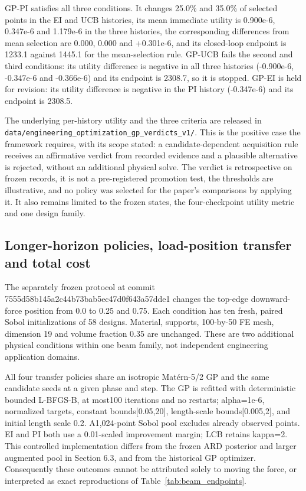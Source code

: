 \documentclass[]{interact}
\begin{document}
GP-PI satisfies all three conditions. It changes 25.0\% and 35.0\% of selected points in the EI and UCB histories, its mean immediate utility is 0.900e-6, 0.347e-6 and 1.179e-6 in the three histories, the corresponding differences from mean selection are 0.000, 0.000 and +0.301e-6, and its closed-loop endpoint is 1233.1 against 1445.1 for the mean-selection rule. GP-UCB fails the second and third conditions: its utility difference is negative in all three histories (-0.900e-6, -0.347e-6 and -0.366e-6) and its endpoint is 2308.7, so it is stopped. GP-EI is held for revision: its utility difference is negative in the PI history (-0.347e-6) and its endpoint is 2308.5.

The underlying per-history utility and the three criteria are released in \texttt{data/engineering\_optimization\_gp\_verdicts\_v1/}. This is the positive case the framework requires, with its scope stated: a candidate-dependent acquisition rule receives an affirmative verdict from recorded evidence and a plausible alternative is rejected, without an additional physical solve. The verdict is retrospective on frozen records, it is not a pre-registered promotion test, the thresholds are illustrative, and no policy was selected for the paper's comparisons by applying it. It also remains limited to the frozen states, the four-checkpoint utility metric and one design family.

\hypertarget{longer-horizon-policies-load-position-transfer-and-total-cost}{%
\subsection{Longer-horizon policies, load-position transfer and total cost}\label{longer-horizon-policies-load-position-transfer-and-total-cost}}

The separately frozen protocol at commit 7555d58b145a2c44b73bab5ec47d0f643a57dde1 changes the top-edge downward-force position from 0.0 to 0.25 and 0.75. Each condition has ten fresh, paired Sobol initializations of 58 designs. Material, supports, 100-by-50 FE mesh, dimension 19 and volume fraction 0.35 are unchanged. These are two additional physical conditions within one beam family, not independent engineering application domains.

All four transfer policies share an isotropic Matérn-5/2 GP and the same candidate seeds at a given phase and step. The GP is refitted with deterministic bounded L-BFGS-B, at most100 iterations and no restarts; alpha=1e-6, normalized targets, constant bounds{[}0.05,20{]}, length-scale bounds{[}0.005,2{]}, and initial length scale 0.2. A1,024-point Sobol pool excludes already observed points. EI and PI both use a 0.01-scaled improvement margin; LCB retains kappa=2. This controlled implementation differs from the frozen ARD posterior and larger augmented pool in Section 6.3, and from the historical GP optimizer. Consequently these outcomes cannot be attributed solely to moving the force, or interpreted as exact reproductions of Table~\ref{tab:beam_endpoints}.
\end{document}
